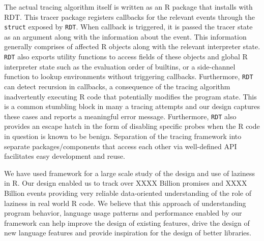\documentclass[acmsmall,review]{acmart}
\begin{document}
The actual tracing algorithm itself is written as an R package that installs
with RDT. This tracer package registers callbacks for the relevant events
through the \texttt{struct} exposed by \texttt{RDT}. When callback is triggered,
it is passed the tracer state as an argument along with the information about
the event. This information generally comprises of affected R objects along with
the relevant interpreter state. \texttt{RDT} also exports utility functions to
access fields of these objects and global R interpreter state such as the
evaluation order of builtins, or a side-channel function to lookup environments
without triggering callbacks. Furthermore, \texttt{RDT} can detect recursion in
callbacks, a consequence of the tracing algorithm inadvertently executing R code
that potentially modifies the program state. This is a common stumbling block in
many a tracing attempts and our design captures these cases and reports a
meaningful error message. Furthermore, \texttt{RDT} also provides an escape
hatch in the form of disabling specific probes when the R code in question is
known to be benign. Separation of the tracing framework into separate
packages/components that access each other via well-defined API facilitates easy
development and reuse.

We have used framework for a large scale study of the design and use of
laziness in R. Our design enabled us to track over XXXX Billion promises and
XXXX Billion events providing very reliable data-oriented understanding of
the role of laziness in real world R code. We believe that this approach of
understanding program behavior, language usage patterns and performance enabled
by our framework can help improve the design of existing features, drive the
design of new language features and provide inspiration for the design of better
libraries.
\end{document}
